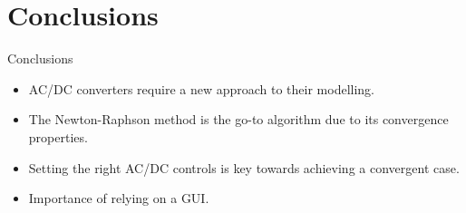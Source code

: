 \section{Conclusions}

\begin{frame}{}
    \tableofcontents[currentsection]
\end{frame}

\begin{frame}{Conclusions}
    \begin{itemize}
        \item AC/DC converters require a new approach to their modelling.
        \item The Newton-Raphson method is the go-to algorithm due to its convergence properties.
        \item Setting the right AC/DC controls is key towards achieving a convergent case.
        \item Importance of relying on a GUI.
    \end{itemize}
    
\end{frame}
